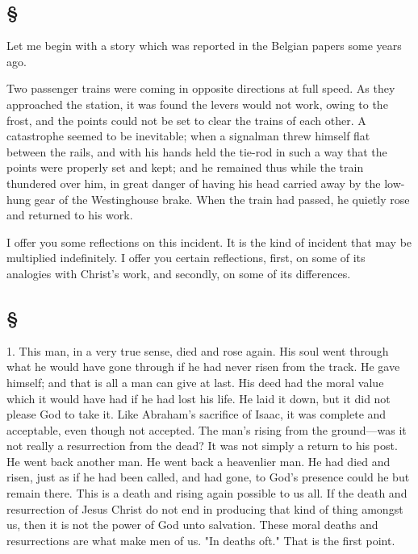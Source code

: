 \documentclass[draft]{ptfdoc}
\begin{document}
\subsection*{ \S }

Let me begin with a story which was reported 
in the Belgian papers some years ago. 

Two passenger trains were coming in opposite 
directions at full speed. As they approached the 
station, it was found the levers would not work, 
owing to the frost, and the points could not be 
set to clear the trains of each other. A catastrophe 
seemed to be inevitable; when a signalman threw himself flat between the rails, and 
with his hands held the tie-rod in such a way 
that the points were properly set and kept; and 
he remained thus while the train thundered 
over him, in great danger of having his head 
carried away by the low-hung gear of the 
Westinghouse brake. When the train had 
passed, he quietly rose and returned to his 
work. 

I offer you some reflections on this incident. 
It is the kind of incident that may be multiplied
indefinitely. I offer you certain reflections, 
first, on some of its analogies with Christ's 
work, and secondly, on some of its differences. 

\subsection*{ \S } 

1. This man, in a very true sense, died and 
rose again. His soul went through what he 
would have gone through if he had never risen 
from the track. He gave himself; and that is 
all a man can give at last. His deed had the 
moral value which it would have had if he had 
lost his life. He laid it down, but it did not 
please God to take it. Like Abraham's sacrifice 
of Isaac, it was complete and acceptable, even 
though not accepted. The man's rising from 
the ground---was it not really a resurrection 
from the dead? It was not simply a return to 
his post. He went back another man. He went 
back a heavenlier man. He had died and risen, 
just as if he had been called, and had gone, to 
God's presence could he but remain there. 
This is a death and rising again possible to us 
all. If the death and resurrection of Jesus 
Christ do not end in producing that kind of 
thing amongst us, then it is not the power of 
God unto salvation. These moral deaths and 
resurrections are what make men of us. "In 
deaths oft." That is the first point. 
\end{document}

